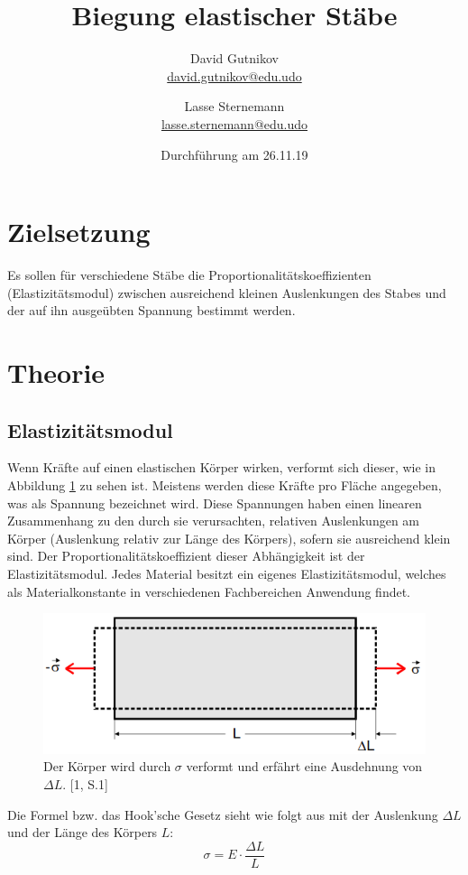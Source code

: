 \documentclass[titlepage = firstcover]{scrartcl}
\title{Biegung elastischer Stäbe}
\author{
  David Gutnikov \\
  \href{mailto:david.gutnikov@edu.udo}{david.gutnikov@edu.udo} \and
  Lasse Sternemann \\
  \href{mailto:lasse.sternemann@edu.udo}{lasse.sternemann@edu.udo}}
\date{Durchführung am 26.11.19}
\begin{document}
    \maketitle
    \tableofcontents
    \newpage
    
    \section{Zielsetzung}
      Es sollen für verschiedene Stäbe die Proportionalitätskoeffizienten (Elastizitätsmodul) zwischen ausreichend kleinen Auslenkungen des Stabes und der auf ihn ausgeübten Spannung bestimmt werden.

    \section{Theorie}
      \subsection{Elastizitätsmodul}
        Wenn Kräfte auf einen elastischen Körper wirken, verformt sich dieser, wie in Abbildung \ref{fig:verformung}
        zu sehen ist. Meistens werden diese Kräfte pro Fläche angegeben, was als Spannung bezeichnet wird.
        Diese Spannungen haben einen linearen Zusammenhang zu den durch sie verursachten, relativen Auslenkungen am
        Körper (Auslenkung relativ zur Länge des Körpers), sofern sie ausreichend klein sind.
        Der Proportionalitätskoeffizient dieser Abhängigkeit ist der Elastizitätsmodul. Jedes Material besitzt ein
        eigenes Elastizitätsmodul, welches als Materialkonstante in verschiedenen Fachbereichen Anwendung findet.
        \begin{figure}[h]
          \centering
          \includegraphics[width=0.75\linewidth]{Verformung.png}
          \caption{Der Körper wird durch $\sigma$ verformt und erfährt eine Ausdehnung von $\Delta L$. [1, S.1]}
          \label{fig:verformung}
        \end{figure}
        
        Die Formel bzw. das \glqq Hook'sche Gesetz\grqq{} sieht wie folgt aus mit der Auslenkung $\Delta L$ und der Länge des Körpers $L$:
        \begin{equation*}
          \sigma = E \cdot \frac{\Delta L}{L}
        \end{equation*}
        
\end{document}
